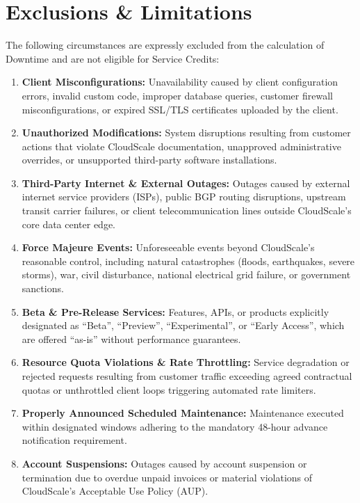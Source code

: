 \documentclass[10pt,letterpaper]{article}
\begin{document}
\section{Exclusions \& Limitations}
The following circumstances are expressly excluded from the calculation of Downtime and are not eligible for Service Credits:
\begin{enumerate}[leftmargin=1.5em, itemsep=0.5pt, topsep=1pt]
  \item \textbf{Client Misconfigurations:} Unavailability caused by client configuration errors, invalid custom code, improper database queries, customer firewall misconfigurations, or expired SSL/TLS certificates uploaded by the client.
  \item \textbf{Unauthorized Modifications:} System disruptions resulting from customer actions that violate CloudScale documentation, unapproved administrative overrides, or unsupported third-party software installations.
  \item \textbf{Third-Party Internet \& External Outages:} Outages caused by external internet service providers (ISPs), public BGP routing disruptions, upstream transit carrier failures, or client telecommunication lines outside CloudScale's core data center edge.
  \item \textbf{Force Majeure Events:} Unforeseeable events beyond CloudScale's reasonable control, including natural catastrophes (floods, earthquakes, severe storms), war, civil disturbance, national electrical grid failure, or government sanctions.
  \item \textbf{Beta \& Pre-Release Services:} Features, APIs, or products explicitly designated as ``Beta'', ``Preview'', ``Experimental'', or ``Early Access'', which are offered ``as-is'' without performance guarantees.
  \item \textbf{Resource Quota Violations \& Rate Throttling:} Service degradation or rejected requests resulting from customer traffic exceeding agreed contractual quotas or unthrottled client loops triggering automated rate limiters.
  \item \textbf{Properly Announced Scheduled Maintenance:} Maintenance executed within designated windows adhering to the mandatory 48-hour advance notification requirement.
  \item \textbf{Account Suspensions:} Outages caused by account suspension or termination due to overdue unpaid invoices or material violations of CloudScale's Acceptable Use Policy (AUP).
\end{enumerate}
\end{document}
